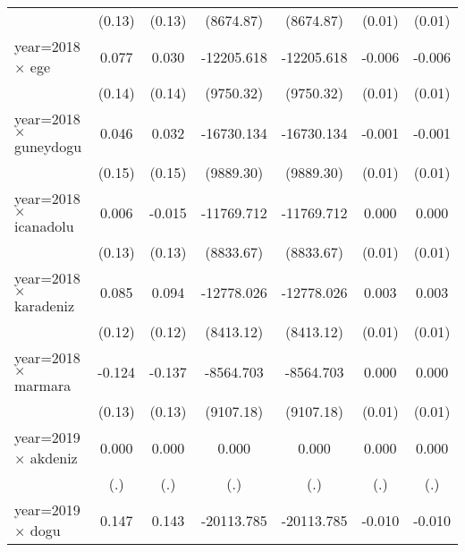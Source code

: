 {\begin{tabular}{l*{6}{c}}
                    &      (0.13)         &      (0.13)         &   (8674.87)         &   (8674.87)         &      (0.01)         &      (0.01)         \\
year=2018 $\times$ ege&       0.077         &       0.030         &  -12205.618         &  -12205.618         &      -0.006         &      -0.006         \\
                    &      (0.14)         &      (0.14)         &   (9750.32)         &   (9750.32)         &      (0.01)         &      (0.01)         \\
year=2018 $\times$ guneydogu&       0.046         &       0.032         &  -16730.134         &  -16730.134         &      -0.001         &      -0.001         \\
                    &      (0.15)         &      (0.15)         &   (9889.30)         &   (9889.30)         &      (0.01)         &      (0.01)         \\
year=2018 $\times$ icanadolu&       0.006         &      -0.015         &  -11769.712         &  -11769.712         &       0.000         &       0.000         \\
                    &      (0.13)         &      (0.13)         &   (8833.67)         &   (8833.67)         &      (0.01)         &      (0.01)         \\
year=2018 $\times$ karadeniz&       0.085         &       0.094         &  -12778.026         &  -12778.026         &       0.003         &       0.003         \\
                    &      (0.12)         &      (0.12)         &   (8413.12)         &   (8413.12)         &      (0.01)         &      (0.01)         \\
year=2018 $\times$ marmara&      -0.124         &      -0.137         &   -8564.703         &   -8564.703         &       0.000         &       0.000         \\
                    &      (0.13)         &      (0.13)         &   (9107.18)         &   (9107.18)         &      (0.01)         &      (0.01)         \\
year=2019 $\times$ akdeniz&       0.000         &       0.000         &       0.000         &       0.000         &       0.000         &       0.000         \\
                    &         (.)         &         (.)         &         (.)         &         (.)         &         (.)         &         (.)         \\
year=2019 $\times$ dogu&       0.147         &       0.143         &  -20113.785\sym{*}  &  -20113.785\sym{*}  &      -0.010         &      -0.010         \\

\end{tabular}}
